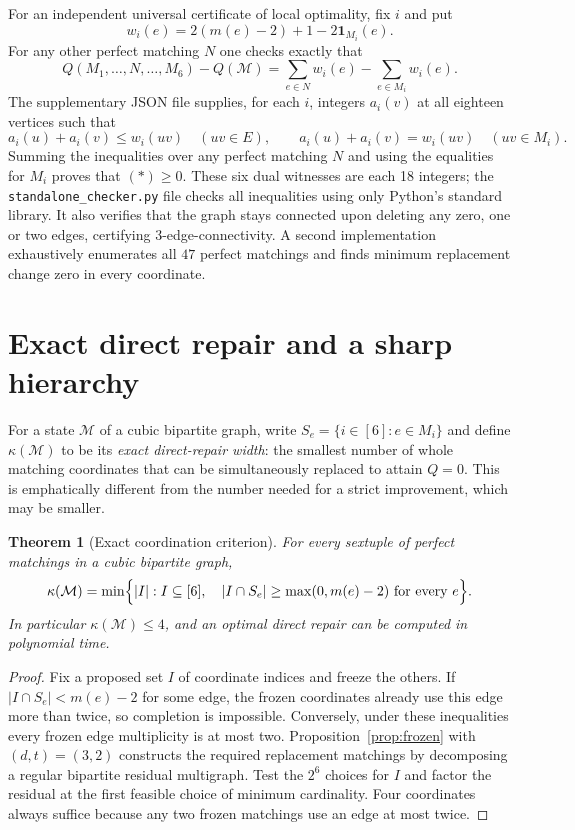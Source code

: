\documentclass[11pt]{article}
\newtheorem{theorem}{Theorem}[section]
\begin{document}
For an independent universal certificate of local optimality,
fix $i$ and put
\[
 w_i(e)=2(m(e)-2)+1-2\mathbf1_{M_i}(e).
\]
For any other perfect matching $N$ one checks exactly that
\[
 Q(M_1,\ldots,N,\ldots,M_6)-Q(\mathcal M)
 = \sum_{e\in N}w_i(e)-\sum_{e\in M_i}w_i(e).\tag{$\ast$}
\]
The supplementary JSON file supplies, for each $i$, integers
$a_i(v)$ at all eighteen vertices such that
\[
 a_i(u)+a_i(v)\le w_i(uv)\quad (uv\in E),\qquad
 a_i(u)+a_i(v)=w_i(uv)\quad(uv\in M_i).
\]
Summing the inequalities over any perfect matching $N$ and
using the equalities for $M_i$ proves that $(\ast)\ge0$.
These six dual witnesses are each 18 integers; the
\texttt{standalone\_checker.py} file checks all inequalities using
only Python's standard library. It also verifies that the graph
stays connected upon deleting any zero, one or two edges,
certifying 3-edge-connectivity. A second implementation
exhaustively enumerates all $47$ perfect matchings and finds
minimum replacement change zero in every coordinate.


\section{Exact direct repair and a sharp hierarchy}\label{sec:hierarchy}
For a state $\mathcal M$ of a cubic bipartite graph, write
$S_e=\{i\in[6]:e\in M_i\}$ and define $\kappa(\mathcal M)$ to be
its \emph{exact direct-repair width}: the smallest number of whole
matching coordinates that can be simultaneously replaced to attain
$Q=0$. This is emphatically different from the number needed for a
strict improvement, which may be smaller.

\begin{theorem}[Exact coordination criterion]\label{thm:coordinate}
For every sextuple of perfect matchings in a cubic bipartite graph,
\[
\kappa(\mathcal M)=\min\Bigl\{|I|:I\subseteq[6],\quad
 |I\cap S_e|\ge\max(0,m(e)-2)\text{ for every }e\Bigr\}.
\]
In particular $\kappa(\mathcal M)\le4$, and an optimal direct repair
can be computed in polynomial time.
\end{theorem}
\begin{proof}
Fix a proposed set $I$ of coordinate indices and freeze the others.
If $|I\cap S_e|<m(e)-2$ for some edge, the frozen coordinates
already use this edge more than twice, so completion is impossible.
Conversely, under these inequalities every frozen edge multiplicity
is at most two. Proposition~\ref{prop:frozen} with $(d,t)=(3,2)$
constructs the required replacement matchings by decomposing a
regular bipartite residual multigraph. Test the $2^6$ choices for
$I$ and factor the residual at the first feasible choice of minimum
cardinality. Four coordinates always suffice because any two frozen
matchings use an edge at most twice.
\end{proof}
\end{document}
